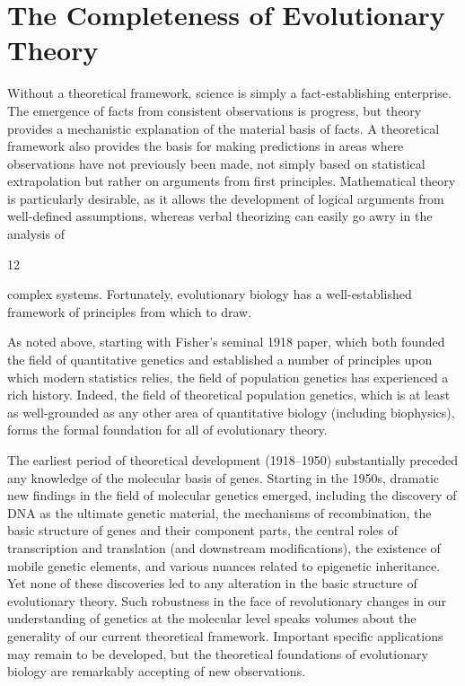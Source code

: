 \documentclass{article}
\begin{document}
\section{The Completeness of Evolutionary Theory}
Without a theoretical framework, science is simply a fact-establishing enterprise. The emergence of facts from consistent observations is progress, but theory provides a mechanistic explanation of the material basis of facts. A theoretical framework also provides the basis for making predictions in areas where observations have not previously been made, not simply based on statistical extrapolation but rather on arguments from first principles. Mathematical theory is particularly desirable, as it allows the development of logical arguments from well-defined assumptions, whereas verbal theorizing can easily go awry in the analysis of

12

complex systems. Fortunately, evolutionary biology has a well-established framework of principles from which to draw.

As noted above, starting with Fisher's seminal 1918 paper, which both founded the field of quantitative genetics and established a number of principles upon which modern statistics relies, the field of population genetics has experienced a rich history. Indeed, the field of theoretical population genetics, which is at least as well-grounded as any other area of quantitative biology (including biophysics), forms the formal foundation for all of evolutionary theory.

The earliest period of theoretical development (1918–1950) substantially preceded any knowledge of the molecular basis of genes. Starting in the 1950s, dramatic new findings in the field of molecular genetics emerged, including the discovery of DNA as the ultimate genetic material, the mechanisms of recombination, the basic structure of genes and their component parts, the central roles of transcription and translation (and downstream modifications), the existence of mobile genetic elements, and various nuances related to epigenetic inheritance. Yet none of these discoveries led to any alteration in the basic structure of evolutionary theory. Such robustness in the face of revolutionary changes in our understanding of genetics at the molecular level speaks volumes about the generality of our current theoretical framework. Important specific applications may remain to be developed, but the theoretical foundations of evolutionary biology are remarkably accepting of new observations.
\end{document}
